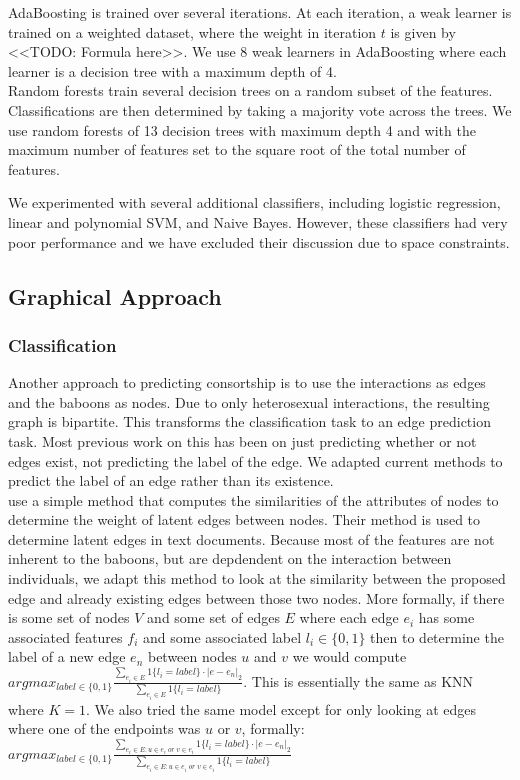 \documentclass[twoside,twocolumn,paper=letter,fontsize=11pt]{article}
\begin{document}
AdaBoosting is trained over several iterations. At each iteration, a weak
learner is trained on a weighted dataset, where the weight in iteration $t$ is
given by <<TODO: Formula here>>. We use 8 weak learners in AdaBoosting
where each learner is a decision tree with a maximum depth of 4.\\

Random forests train several decision trees on a random subset of the features.
Classifications are then determined by taking a majority vote across the trees.
We use random forests of 13 decision trees with maximum depth 4 and with the
maximum number of features set to the square root of the total number of
features.

We experimented with several additional classifiers, including logistic
regression, linear and polynomial SVM, and Naive Bayes. However, these
classifiers had very poor performance and we have excluded their discussion due
to space constraints.

\subsection{Graphical Approach}

\subsubsection*{Classification}
Another approach to predicting consortship is to use the interactions as edges
and the baboons as nodes. Due to only heterosexual interactions, the resulting
graph is bipartite. This transforms the classification task to an edge
prediction task. Most previous work on this has been on just predicting whether
or not edges exist, not predicting the label of the edge. We adapted current
methods to predict the label of an edge rather than its existence.\\ 

\cite{Macskassy:2007} use a simple method that computes the similarities of the
attributes of nodes to determine the weight of latent edges between nodes. Their method is used to determine latent edges in text documents. Because most of the features are not inherent to the baboons, but are
depdendent on the interaction between individuals, we adapt this method to look
at the similarity between the proposed edge and already existing edges between
those two nodes. More formally, if there is some set of nodes $V$ and some set
of edges $E$ where each edge $e_i$ has some associated features $f_i$ and some
associated label $l_i\in \{0,1\}$ then to determine the label of a new edge
$e_n$ between nodes $u$ and $v$ we would compute $argmax_{label \in \{0,1\}}
\frac{\sum_{e_i \in E}1\{l_i=label\}\cdot|e-e_n|_2}{\sum_{e_i \in
E}1\{l_i=label\}}$. This is essentially the same as KNN where $K=1$. We also tried the same model except for only looking at edges where one of the endpoints was $u$ or $v$, formally: $argmax_{label \in \{0,1\}} \frac{\sum_{e_i \in E:u \in e_i \; or\; v \in e_i}1\{l_i=label\}\cdot|e-e_n|_2}{\sum_{e_i \in E:u \in e_i \; or\; v \in e_i}1\{l_i=label\}}$
\end{document}
